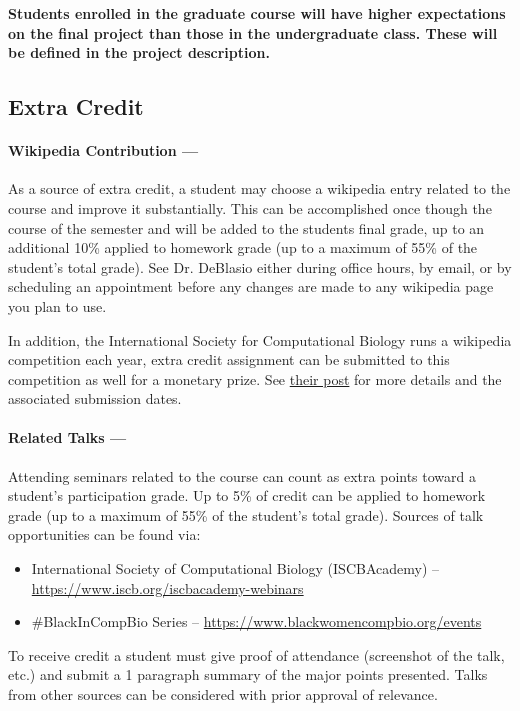 \documentclass[12pt]{scrartcl}
\begin{document}
\textbf{Students enrolled in the graduate course will have higher expectations on the final project than those in the undergraduate class. 
These will be defined in the project description.}

\subsection{Extra Credit}
\paragraph{Wikipedia Contribution ---} As a source of extra credit, a student may choose a wikipedia entry related to the course and improve it substantially. 
This can be accomplished once though the course of the semester and will be added to the students final grade, 
up to an additional 10\% applied to homework grade (up to a maximum of 55\% of the student's total grade).
See Dr. DeBlasio either during office hours, by email, or by scheduling an appointment before any changes are made to any wikipedia page you plan to use.

In addition, the International Society for Computational Biology runs a wikipedia competition each year, 
extra credit assignment can be submitted to this competition as well for a monetary prize. 
See \href{https://en.wikipedia.org/wiki/Wikipedia:WikiProject_Molecular_Biology/Computational_Biology/10th_ISCB_Wikipedia_competition_announcement} {their post} 
for more details and the associated submission dates. 

\paragraph{Related Talks ---} Attending seminars related to the course can count as extra points toward a student's participation grade. 
Up to 5\% of credit can be applied to homework grade (up to a maximum of 55\% of the student's total grade). 
Sources of talk opportunities can be found via: 
\begin{itemize}
\item International Society of Computational Biology (ISCBAcademy) -- \\\url{https://www.iscb.org/iscbacademy-webinars}
\item \#BlackInCompBio Series -- \url{https://www.blackwomencompbio.org/events}
\end{itemize}
To receive credit a student must give proof of attendance (screenshot of the talk, etc.) and submit a 1 paragraph summary of the major points presented. 
Talks from other sources can be considered with prior approval of relevance. 
\end{document}

